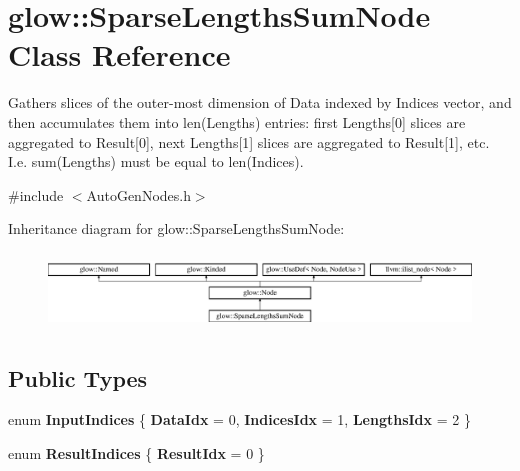 \hypertarget{classglow_1_1_sparse_lengths_sum_node}{}\section{glow\+:\+:Sparse\+Lengths\+Sum\+Node Class Reference}
\label{classglow_1_1_sparse_lengths_sum_node}


Gathers slices of the outer-\/most dimension of Data indexed by Indices vector, and then accumulates them into len(\+Lengths) entries\+: first Lengths\mbox{[}0\mbox{]} slices are aggregated to Result\mbox{[}0\mbox{]}, next Lengths\mbox{[}1\mbox{]} slices are aggregated to Result\mbox{[}1\mbox{]}, etc. I.\+e. sum(\+Lengths) must be equal to len(\+Indices).  




{\ttfamily \#include $<$Auto\+Gen\+Nodes.\+h$>$}

Inheritance diagram for glow\+:\+:Sparse\+Lengths\+Sum\+Node\+:\begin{figure}[H]
\begin{center}
\leavevmode
\includegraphics[height=2.028986cm]{classglow_1_1_sparse_lengths_sum_node}
\end{center}
\end{figure}
\subsection*{Public Types}
\begin{DoxyCompactItemize}
\item 
\mbox{\label{classglow_1_1_sparse_lengths_sum_node_afef00dade4aab2c61ac8c7b5247d87aa}} 
enum {\bfseries Input\+Indices} \{ {\bfseries Data\+Idx} = 0, 
{\bfseries Indices\+Idx} = 1, 
{\bfseries Lengths\+Idx} = 2
 \}
\item 
\mbox{\label{classglow_1_1_sparse_lengths_sum_node_aeb04d86486a43affcc6c410c631f43e9}} 
enum {\bfseries Result\+Indices} \{ {\bfseries Result\+Idx} = 0
 \}
\end{DoxyCompactItemize}
